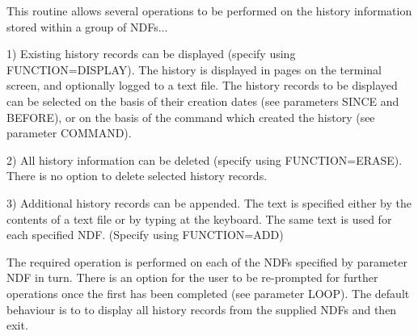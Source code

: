 \begin{small}
{{      This routine allows several operations to be performed on the
      history information stored within a group of NDFs...

      1) Existing history records can be displayed (specify using
      FUNCTION=DISPLAY). The history is displayed in pages on the
      terminal screen, and optionally logged to a text file. The
      history records to be displayed can be selected on the basis of
      their creation dates (see parameters SINCE and BEFORE), or on the
      basis of the command which created the history (see parameter
      COMMAND).

      2) All history information can be deleted (specify using
      FUNCTION=ERASE). There is no option to delete selected history
      records.

      3) Additional history records can be appended. The text is
      specified either by the contents of a text file or by typing at
      the keyboard. The same text is used for each specified NDF.
      (Specify using FUNCTION=ADD)

      The required operation is performed on each of the NDFs specified
      by parameter NDF in turn.  There is an option for the user to be
      re-prompted for further operations once the first has been
      completed (see parameter LOOP).  The default behaviour is to to
      display all history records from the supplied NDFs and then exit.

}}
\end{small}
